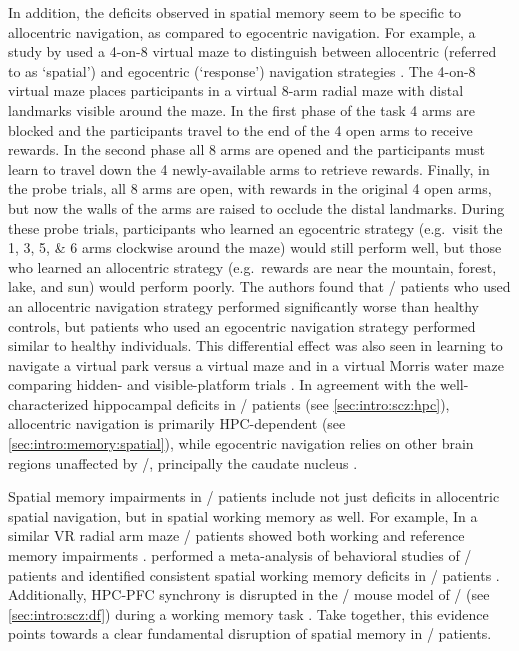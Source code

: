 In addition, the deficits observed in spatial memory seem to be specific to allocentric navigation, as compared to egocentric navigation.
For example, a study by \citeauthor{Wilkins2013} used a 4-on-8 virtual maze to distinguish between allocentric (referred to as `spatial') and egocentric (`response') navigation strategies \citep{Wilkins2013}.
The 4-on-8 virtual maze places participants in a virtual 8-arm radial maze with distal landmarks visible around the maze.
In the first phase of the task 4 arms are blocked and the participants travel to the end of the 4 open arms to receive rewards.
In the second phase all 8 arms are opened and the participants must learn to travel down the 4 newly-available arms to retrieve rewards.
Finally, in the probe trials, all 8 arms are open, with rewards in the original 4 open arms, but now the walls of the arms are raised to occlude the distal landmarks.
During these probe trials, participants who learned an egocentric strategy (e.g.~visit the 1, 3, 5, \& 6 arms clockwise around the maze) would still perform well, but those who learned an allocentric strategy (e.g.~rewards are near the mountain, forest, lake, and sun) would perform poorly.
The authors found that \scz/ patients who used an allocentric navigation strategy performed significantly worse than healthy controls, but patients who used an egocentric navigation strategy performed similar to healthy individuals.
This differential effect was also seen in learning to navigate a virtual park versus a virtual maze \citep{Weniger2008} and in a virtual Morris water maze comparing hidden- and visible-platform trials \citep{Hanlon2006}.
In agreement with the well-characterized hippocampal deficits in \scz/ patients (see \autoref{sec:intro:scz:hpc}), allocentric navigation is primarily \ac{HPC}-dependent (see \autoref{sec:intro:memory:spatial}), while egocentric navigation relies on other brain regions unaffected by \scz/, principally the caudate nucleus \citep{Hartley2003}.

Spatial memory impairments in \scz/ patients include not just deficits in allocentric spatial navigation, but in spatial working memory as well.
For example, In a similar VR radial arm maze \scz/ patients showed both working and reference memory impairments \citep{Spieker2012}.
\citeauthor{Piskulic2007} performed a meta-analysis of behavioral studies of \scz/ patients and identified consistent spatial working memory deficits in \scz/ patients \citep{Piskulic2007}.
Additionally, \ac{HPC}-\ac{PFC} synchrony is disrupted in the \df/ mouse model of \scz/ (see \autoref{sec:intro:scz:df}) during a working memory task \citep{Sigurdsson2010}.
Take together, this evidence points towards a clear fundamental disruption of spatial memory in \scz/ patients.

